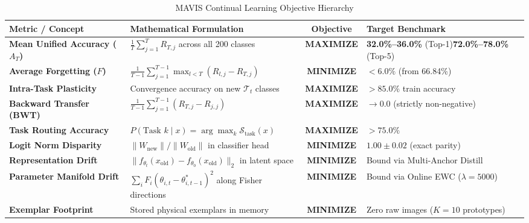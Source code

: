 \documentclass[11pt,a4paper]{article}
\begin{document}
\begin{table}[h!]
\centering
\small
\renewcommand{\arraystretch}{1.25}
\caption{MAVIS Continual Learning Objective Hierarchy}
\label{tab:objectives}
\begin{tabularx}{\textwidth}{p{4.2cm} p{4.2cm} c p{4cm}}
\toprule
\textbf{Metric / Concept} & \textbf{Mathematical Formulation} & \textbf{Objective} & \textbf{Target Benchmark} \\
\midrule
\textbf{Mean Unified Accuracy ($A_T$)} & $\frac{1}{T} \sum_{j=1}^{T} R_{T, j}$ across all 200 classes & \textbf{MAXIMIZE} & \textbf{32.0\%--36.0\%} (Top-1)\newline \textbf{72.0\%--78.0\%} (Top-5) \\
\textbf{Average Forgetting ($F$)} & $\frac{1}{T-1} \sum_{j=1}^{T-1} \max_{l < T} (R_{l, j} - R_{T, j})$ & \textbf{MINIMIZE} & \textbf{$< 6.0\%$} (from 66.84\%) \\
\textbf{Intra-Task Plasticity} & Convergence accuracy on new $\mathcal{T}_t$ classes & \textbf{MAXIMIZE} & \textbf{$> 85.0\%$} train accuracy \\
\textbf{Backward Transfer (BWT)} & $\frac{1}{T-1} \sum_{j=1}^{T-1} (R_{T, j} - R_{j, j})$ & \textbf{MAXIMIZE} & $\to 0.0$ (strictly non-negative) \\
\textbf{Task Routing Accuracy} & $P(\text{Task } k \mid x) = \arg\max_k \mathcal{S}_{\text{task}}(x)$ & \textbf{MAXIMIZE} & \textbf{$> 75.0\%$} \\
\textbf{Logit Norm Disparity} & $\|W_{\text{new}}\| / \|W_{\text{old}}\|$ in classifier head & \textbf{MINIMIZE} & $\mathbf{1.00 \pm 0.02}$ (exact parity) \\
\textbf{Representation Drift} & $\|f_{\theta_t}(x_{\text{old}}) - f_{\theta_0}(x_{\text{old}})\|_2$ in latent space & \textbf{MINIMIZE} & Bound via Multi-Anchor Distill \\
\textbf{Parameter Manifold Drift} & $\sum_i F_i (\theta_{i, t} - \theta_{i, t-1}^*)^2$ along Fisher directions & \textbf{MINIMIZE} & Bound via Online EWC ($\lambda=5000$) \\
\textbf{Exemplar Footprint} & Stored physical exemplars in memory & \textbf{MINIMIZE} & Zero raw images ($K=10$ prototypes) \\
\bottomrule
\end{tabularx}
\end{table}
\end{document}
